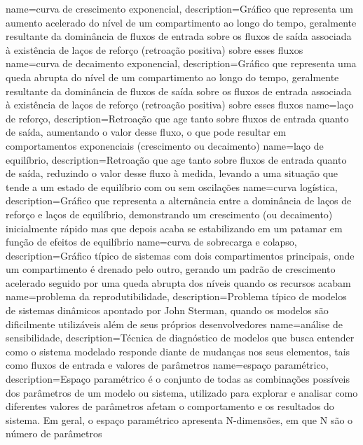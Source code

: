 {
    name=curva de crescimento exponencial,
    description={Gráfico que representa um aumento acelerado do nível de um compartimento ao longo do tempo, geralmente resultante da dominância de fluxos de entrada sobre os fluxos de saída associada à existência de laços de reforço (retroação positiva) sobre esses fluxos}
}
{
    name=curva de decaimento exponencial,
    description={Gráfico que representa uma queda abrupta do nível de um compartimento ao longo do tempo, geralmente resultante da dominância de fluxos de saída sobre os fluxos de entrada associada à existência de laços de reforço (retroação positiva) sobre esses fluxos}
}
{
    name=laço de reforço,
    description={Retroação que age tanto sobre fluxos de entrada quanto de saída, aumentando o valor desse fluxo, o que pode resultar em comportamentos exponenciais (crescimento ou decaimento)}
}
{
    name=laço de equilíbrio,
    description={Retroação que age tanto sobre fluxos de entrada quanto de saída, reduzindo o valor desse fluxo à medida, levando a uma situação que tende a um estado de equilíbrio com ou sem oscilações}
}
{
    name=curva logística,
    description={Gráfico que representa a alternância entre a dominância de laços de reforço e laços de equilíbrio, demonstrando um crescimento (ou decaimento) inicialmente rápido mas que depois acaba se estabilizando em um patamar em função de efeitos de equilíbrio}
}
{
    name=curva de sobrecarga e colapso,
    description={Gráfico típico de sistemas com dois compartimentos principais, onde um compartimento é drenado pelo outro, gerando um padrão de crescimento acelerado seguido por uma queda abrupta dos níveis quando os recursos acabam}
}
{
    name=problema da reprodutibilidade,
    description={Problema típico de modelos de sistemas dinâmicos apontado por John Sterman, quando os modelos são dificilmente utilizáveis além de seus próprios desenvolvedores}
}
{
    name=análise de sensibilidade,
    description={Técnica de diagnóstico de modelos que busca entender como o sistema modelado responde diante de mudanças nos seus elementos, tais como fluxos de entrada e valores de parâmetros}
}
{
    name=espaço paramétrico,
    description={Espaço paramétrico é o conjunto de todas as combinações possíveis dos parâmetros de um modelo ou sistema, utilizado para explorar e analisar como diferentes valores de parâmetros afetam o comportamento e os resultados do sistema. Em geral, o espaço paramétrico apresenta N-dimensões, em que N são o número de parâmetros}
}
